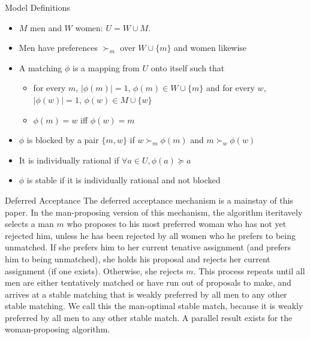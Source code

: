 \documentclass{beamer}
\begin{document}
\begin{frame}{Model Definitions}
	\begin{itemize}
		\item  $M$ men and $W$ women: $U = W \cup M$.  
		\item Men have preferences $\succ_{m}$ over $W \cup \{m\}$ and women likewise
		\item A matching $\phi$ is a mapping from $U$ onto itself such that 
		\begin{itemize}
			\item for every $m$, $|\phi(m)| = 1$, $\phi(m) \in W \cup \{m\} $ and for every  $w$, $|\phi(w)| = 1$, $\phi(w) \in M \cup \{w\}$
			\item $\phi(m) = w$ iff $\phi(w) = m$
		\end{itemize}
	\item $\phi$ is blocked by a pair $\{m,w\}$ if $w \succ_m \phi(m)$ and $m \succ_w \phi(w)$ 
	\item It is individually rational if $\forall a \in U ,\phi(a) \succeq a$ 
	\item $\phi$ is stable if it is individually rational and not blocked
	\end{itemize}
\end{frame}
\begin{frame}{Deferred Acceptance}
	The deferred acceptance mechanism is a mainstay of this paper. In the man-proposing version of this mechanism, the algorithm iteritavely selects a man $m$ who proposes to his most preferred woman who has not yet rejected him, unless he has been rejected by all women who he prefers to being unmatched.  If she prefers him to her current tenative assignment (and prefers him to being unmatched), she holds his proposal and rejects her current assignment (if one exists). Otherwise, she rejects $m$.  This process repeats until all men are either tentatively matched or have run out of proposals to make, and arrives at a stable matching that is weakly preferred by all men to any other stable matching.  We call this the man-optimal stable match, because it is weakly preferred by all men to any other stable match.  A parallel result exists for the woman-proposing algorithm.

\end{frame}
\end{document}
